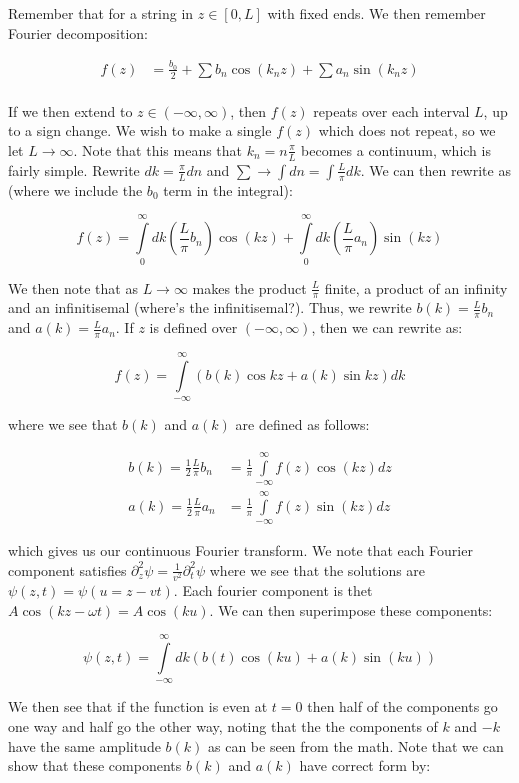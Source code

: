 \documentclass{report}
\begin{document}
Remember that for a string in $z \in [0,L]$ with fixed ends. We then remember Fourier decomposition:

\begin{align*}
f(z) &= \frac{b_0}{2} + \sum{b_n \cos(k_nz)} + \sum{a_n\sin(k_nz)}\\
\end{align*}

If we then extend to $z \in (-\infty,\infty)$, then $f(z)$ repeats over each interval $L$, up to a sign change. We wish to make a single $f(z)$ which does not repeat, so we let $L \to\infty$. Note that this means that $k_n = n\frac{\pi}{L}$ becomes a continuum, which is fairly simple. Rewrite $dk = \frac{\pi}{L}dn$ and $\sum \rightarrow \int dn = \int \frac{L}{\pi}dk$. We can then rewrite as (where we include the $b_0$ term in the integral):

$$f(z) = \displaystyle\int\limits_0^\infty{dk\left(\frac{L}{\pi}b_n\right)\cos(kz)} + \displaystyle\int\limits_0^\infty{dk\left(\frac{L}{\pi}a_n\right)\sin(kz)}$$

We then note that as $L \to \infty$ makes the product $\frac{L}{\pi}$ finite, a product of an infinity and an infinitisemal (where's the infinitisemal?). Thus, we rewrite $b(k) = \frac{L}{\pi}b_n$ and $a(k) = \frac{L}{\pi}a_n$. If $z$ is defined over $(-\infty,\infty)$, then we can rewrite as:

$$f(z) = \displaystyle\int\limits_{-\infty}^\infty{\left(b(k)\cos kz + a(k)\sin kz\right)dk}$$

where we see that $b(k)$ and $a(k)$ are defined as follows:

\begin{align*}
b(k) = \frac{1}{2}\frac{L}{\pi}b_n &= \frac{1}{\pi}\displaystyle\int\limits_{-\infty}^{\infty}f(z)\cos(kz)dz\\
a(k) = \frac{1}{2}\frac{L}{\pi}a_n &= \frac{1}{\pi}\displaystyle\int\limits_{-\infty}^{\infty}f(z)\sin(kz)dz
\end{align*}

which gives us our continuous Fourier transform. We note that each Fourier component satisfies $\partial_z^2 \psi = \frac{1}{v^2} \partial_t^2\psi$ where we see that the solutions are $\psi(z,t) = \psi(u = z - vt)$. Each fourier component is thet $A\cos(kz - \omega t) = A\cos(ku)$. We can then superimpose these components:

$$\psi(z,t) = \displaystyle\int\limits_{-\infty}^{\infty}{dk\left(b(t)\cos(ku) + a(k)\sin(ku)\right)}$$

We then see that if the function is even at $t=0$ then half of the components go one way and half go the other way, noting that the the components of $k$ and $-k$ have the same amplitude $b(k)$ as can be seen from the math. Note that we can show that these components $b(k)$ and $a(k)$ have correct form by:
\end{document}
